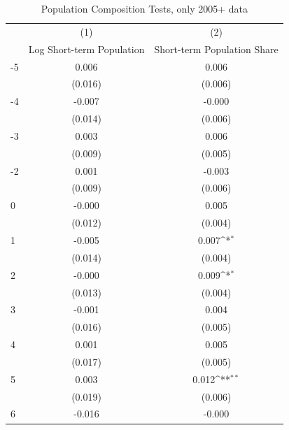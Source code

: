 \begin{table}[htbp]\centering
\def\sym#1{\ifmmode^{#1}\else\(^{#1}\)\fi}
\caption{Population Composition Tests, only 2005+ data}
\begin{tabular}{l*{2}{c}}
\hline\hline
            &\multicolumn{1}{c}{(1)}&\multicolumn{1}{c}{(2)}\\
            &\multicolumn{1}{c}{Log Short-term Population}&\multicolumn{1}{c}{Short-term Population Share}\\
\hline
-5          &       0.006         &       0.006         \\
            &     (0.016)         &     (0.006)         \\
[1em]
-4          &      -0.007         &      -0.000         \\
            &     (0.014)         &     (0.006)         \\
[1em]
-3          &       0.003         &       0.006         \\
            &     (0.009)         &     (0.005)         \\
[1em]
-2          &       0.001         &      -0.003         \\
            &     (0.009)         &     (0.006)         \\
[1em]
0           &      -0.000         &       0.005         \\
            &     (0.012)         &     (0.004)         \\
[1em]
1           &      -0.005         &       0.007\sym{*}  \\
            &     (0.014)         &     (0.004)         \\
[1em]
2           &      -0.000         &       0.009\sym{*}  \\
            &     (0.013)         &     (0.004)         \\
[1em]
3           &      -0.001         &       0.004         \\
            &     (0.016)         &     (0.005)         \\
[1em]
4           &       0.001         &       0.005         \\
            &     (0.017)         &     (0.005)         \\
[1em]
5           &       0.003         &       0.012\sym{**} \\
            &     (0.019)         &     (0.006)         \\
[1em]
6           &      -0.016         &      -0.000         \\

\end{tabular}
\end{table}
